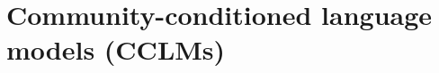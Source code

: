 \documentclass[11pt]{article}
\begin{document}



\section{Community-conditioned language models (CCLMs)}\label{sec:cclm}
\end{document}
